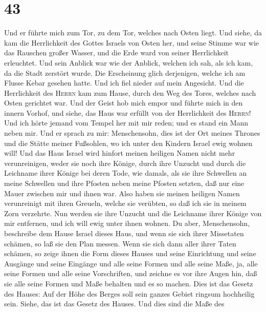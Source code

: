\hypertarget{section-42}{%
\section{43}\label{section-42}}

 Und er führte mich zum Tor, zu dem Tor, welches nach
Osten liegt.  Und siehe, da kam die Herrlichkeit des
Gottes Israels von Osten her, und seine Stimme war wie das Rauschen
großer Wasser, und die Erde ward von seiner Herrlichkeit erleuchtet.
 Und sein Anblick war wie der Anblick, welchen ich sah,
als ich kam, da die Stadt zerstört wurde. Die Erscheinung glich
derjenigen, welche ich am Flusse Kebar gesehen hatte. Und ich fiel
nieder auf mein Angesicht.  Und die Herrlichkeit des
\textsc{Herrn} kam zum Hause, durch den Weg des Tores, welches nach
Osten gerichtet war.  Und der Geist hob mich empor und
führte mich in den innern Vorhof, und siehe, das Haus war erfüllt von
der Herrlichkeit des \textsc{Herrn}!  Und ich hörte jemand
vom Tempel her mit mir reden; und es stand ein Mann neben mir.
 Und er sprach zu mir: Menschensohn, dies ist der Ort
meines Thrones und die Stätte meiner Fußsohlen, wo ich unter den Kindern
Israel ewig wohnen will! Und das Haus Israel wird hinfort meinen
heiligen Namen nicht mehr verunreinigen, weder sie noch ihre Könige,
durch ihre Unzucht und durch die Leichname ihrer Könige bei deren Tode,
 wie damals, als sie ihre Schwellen an meine Schwellen und
ihre Pfosten neben meine Pfosten setzten, daß nur eine Mauer zwischen
mir und ihnen war. Also haben sie meinen heiligen Namen verunreinigt mit
ihren Greueln, welche sie verübten, so daß ich sie in meinem Zorn
verzehrte.  Nun werden sie ihre Unzucht und die Leichname
ihrer Könige von mir entfernen, und ich will ewig unter ihnen wohnen.
 Du aber, Menschensohn, beschreibe dem Hause Israel
dieses Haus, und wenn sie sich ihrer Missetaten schämen, so laß sie den
Plan messen.  Wenn sie sich dann aller ihrer Taten
schämen, so zeige ihnen die Form dieses Hauses und seine Einrichtung und
seine Ausgänge und seine Eingänge und alle seine Formen und alle seine
Maße, ja, alle seine Formen und alle seine Vorschriften, und zeichne es
vor ihre Augen hin, daß sie alle seine Formen und Maße behalten und es
so machen.  Dies ist das Gesetz des Hauses: Auf der Höhe
des Berges soll sein ganzes Gebiet ringsum hochheilig sein. Siehe, das
ist das Gesetz des Hauses.  Und dies sind die Maße des
